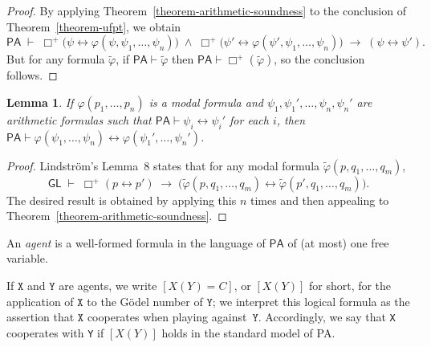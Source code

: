 \documentclass[12pt, letterpaper]{article}
\newtheorem{lemma}[theorem]{Lemma}
\numberwithin{equation}{section}
\newenvironment{definition}[1][Definition]{\begin{trivlist}
\item[\hskip \labelsep {\bfseries #1}]}{\end{trivlist}}
\begin{document}
\begin{proof}
By applying Theorem~\ref{theorem-arithmetic-soundness} to the conclusion of Theorem~\ref{theorem-ufpt}, we obtain
\[
\mathsf{PA} \;\vdash\; \Box^+\big(\psi\leftrightarrow\varphi(\psi,\psi_1,\dotsc,\psi_n)\big) \;\wedge\; \Box^+\big(\psi'\leftrightarrow\varphi(\psi',\psi_1,\dotsc,\psi_n)\big) \;\to\; (\psi\leftrightarrow \psi').
\]
But for any formula $\tilde\varphi$, if $\mathsf{PA}\vdash\tilde\varphi$ then $\mathsf{PA}\vdash\Box^+(\tilde\varphi)$, so the conclusion follows.
\end{proof}

\begin{lemma} \label{lemma-modal-substitution}
If $\varphi(p_1,\dotsc,p_n)$ is a modal formula and $\psi_1,\psi_1',\dotsc,\psi_n,\psi_n'$ are arithmetic formulas such that $\mathsf{PA}\vdash\psi_i\leftrightarrow\psi_i'$ for each $i$, then $\mathsf{PA}\vdash\varphi(\psi_1,\dotsc,\psi_n)\leftrightarrow\varphi(\psi_1',\dotsc,\psi_n')$.
\end{lemma}

\begin{proof}
Lindstr\"om's Lemma~8 states that for any modal formula $\tilde\varphi(p,q_1,\dotsc,q_m)$,
\[
\mathsf{GL}\;\vdash\;\Box^+(p\leftrightarrow p')\;\to\;\big(\tilde\varphi(p,q_1,\dotsc,q_m)\leftrightarrow\tilde\varphi(p',q_1,\dotsc,q_m)\big).
\]
The desired result is obtained by applying this $n$ times and then appealing to Theorem~\ref{theorem-arithmetic-soundness}.
\end{proof}

\begin{definition}
An \emph{agent} is a well-formed formula in the language of $\mathsf{PA}$ of (at most) one free variable.
\end{definition}
If $\texttt X$ and $\texttt Y$ are agents, we write $[X(Y)=C]$, or $[X(Y)]$ for short, for the application of $\texttt X$ to the G\"odel number of $\texttt Y$; we interpret this logical formula as the assertion that $\texttt X$ cooperates when playing against~$\texttt Y$. Accordingly, we say that \texttt{X} cooperates with \texttt{Y} if $[X(Y)]$ holds in the standard model of \textsf{PA}.
\end{document}
